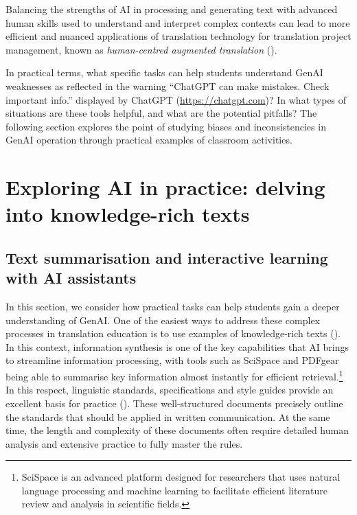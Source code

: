 \documentclass[output=paper]{langscibook}
\begin{document}
Balancing the strengths of AI in processing and generating text with advanced human skills used to understand and interpret complex contexts can lead to more efficient and nuanced applications of translation technology for translation project management, known as \textit{human-centred augmented translation} (\citealt{obrien_human-centered_2024}).

In practical terms, what specific tasks can help students understand GenAI weaknesses as reflected in the warning “ChatGPT can make mistakes. Check important info.” displayed by ChatGPT (\url{https://chatgpt.com})? In what types of situations are these tools helpful, and what are the potential pitfalls? The following section explores the point of studying biases and inconsistencies in GenAI operation through practical examples of classroom activities.

\section{Exploring AI in practice: delving into knowledge-rich texts}\label{sec:8:3}

\subsection{Text summarisation and interactive learning with AI assistants}
In this section, we consider how practical tasks can help students gain a deeper understanding of GenAI. One of the easiest ways to address these complex processes in translation education is to use examples of knowledge-rich texts (\citealt{gledhill2016}). In this context, information synthesis is one of the key capabilities that AI brings to streamline information processing, with tools such as SciSpace and PDFgear being able to summarise key information almost instantly for efficient retrieval.\footnote{SciSpace is an advanced platform designed for researchers that uses natural language processing and machine learning to facilitate efficient literature review and analysis in scientific fields.} In this respect, linguistic standards, specifications and style guides provide an excellent basis for practice (\citealt{gledhillzimina23}). These well-structured documents precisely outline the standards that should be applied in written communication. At the same time, the length and complexity of these documents often require detailed human analysis and extensive practice to fully master the rules.
\end{document}
